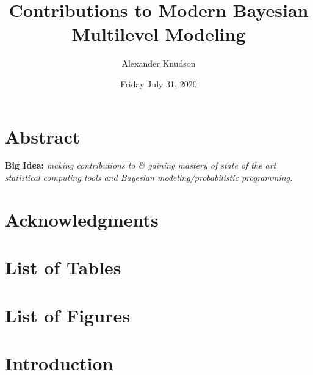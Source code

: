 \documentclass[
]{article}
\title{Contributions to Modern Bayesian Multilevel Modeling}
\author{Alexander Knudson}
\date{Friday July 31, 2020}
\begin{document}
\maketitle

{
\setcounter{tocdepth}{3}
\tableofcontents
}
\hypertarget{abstract}{%
\section*{Abstract}\label{abstract}}


\textbf{Big Idea:} \emph{making contributions to \& gaining mastery of state of the art statistical computing tools and Bayesian modeling/probabilistic programming.}

\hypertarget{acknowledgments}{%
\section*{Acknowledgments}\label{acknowledgments}}


\hypertarget{list-of-tables}{%
\section*{List of Tables}\label{list-of-tables}}


\hypertarget{list-of-figures}{%
\section*{List of Figures}\label{list-of-figures}}


\hypertarget{introduction}{%
\section{Introduction}\label{introduction}}
\end{document}
